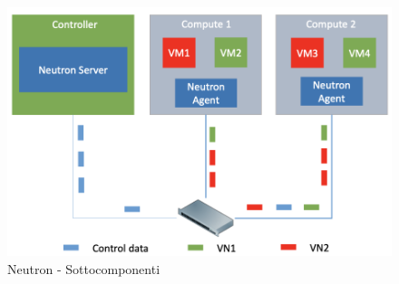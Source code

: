 \documentclass{article}
\begin{document}
\begin{figure}[H]
    \centering
    \includegraphics[scale=0.5]{img/neutron subcomponents.png}
    \caption{Neutron - Sottocomponenti}
\end{figure}\noindent
\end{document}
